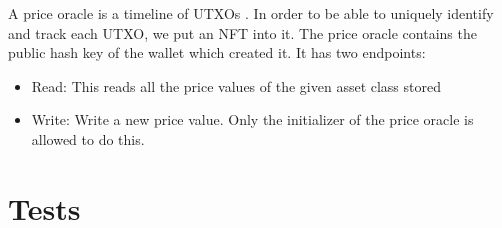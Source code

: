 \documentclass{article} %
\begin{document}

A price oracle is a timeline of UTXOs . In
order to be able to uniquely identify and track each UTXO, we put an NFT into
it. The price oracle contains the public hash key of the wallet which created
it. It has two endpoints:
\begin{itemize}
  \item Read: This reads all the price values of the given asset class stored
  \item Write: Write a new price value. Only the initializer of the price oracle
    is allowed to do this.
\end{itemize}

\section{Tests}


% 
\end{document}
